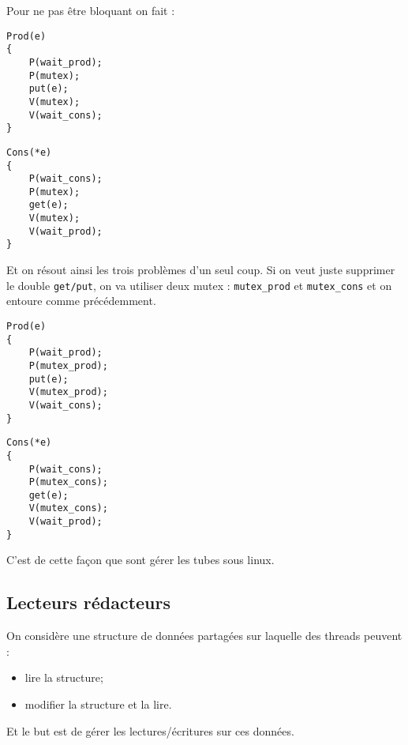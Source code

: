 \documentclass[12pt,a4paper]{report}
\begin{document}
\medskip

Pour ne pas être bloquant on fait :

\medskip

\begin{minipage}{0.5\linewidth}
\begin{verbatim}
Prod(e)
{
    P(wait_prod);
    P(mutex);
    put(e);
    V(mutex);
    V(wait_cons);
}
\end{verbatim}
\end{minipage}
\begin{minipage}{0.5\linewidth}
\begin{verbatim}
Cons(*e)
{
    P(wait_cons);
    P(mutex);
    get(e);
    V(mutex);
    V(wait_prod);
}
\end{verbatim}
\end{minipage}

\medskip

Et on résout ainsi les trois problèmes d'un seul coup. Si on veut juste supprimer le double \verb?get/put?, on va utiliser deux mutex : \verb?mutex_prod? et \verb?mutex_cons? et on entoure comme précédemment.\\

\medskip

\begin{minipage}{0.5\linewidth}
\begin{verbatim}
Prod(e)
{
    P(wait_prod);
    P(mutex_prod);
    put(e);
    V(mutex_prod);
    V(wait_cons);
}
\end{verbatim}
\end{minipage}
\begin{minipage}{0.5\linewidth}
\begin{verbatim}
Cons(*e)
{
    P(wait_cons);
    P(mutex_cons);
    get(e);
    V(mutex_cons);
    V(wait_prod);
}
\end{verbatim}
\end{minipage}

\medskip
C'est de cette façon que sont gérer les tubes sous linux.


\subsection{Lecteurs rédacteurs}

On considère une structure de données partagées sur laquelle des threads peuvent :
\begin{itemize}
\item lire la structure;
\item modifier la structure et la lire.
\end{itemize}
Et le but est de gérer les lectures/écritures sur ces données.
\end{document}
